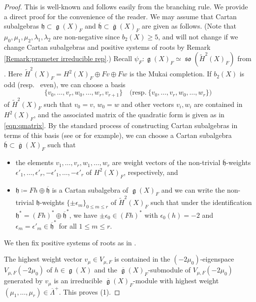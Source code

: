 \documentclass[12pt,reqno]{amsart}
\theoremstyle{definition}
\renewcommand\ge{\mathop{\mathfrak{g}}\nolimits}
\newcommand\so{\mathop{\mathfrak{so}}\nolimits}
\newcommand{\frh}{\mathfrak{h}}
\numberwithin{equation}{section}
\begin{document}
\begin{proof}
    This is well-known and follows easily from the branching rule.
    We provide a direct proof for the convenience of the reader.
    We may assume that Cartan subalgebras $\frh \subset \ge(X)_F$ and $\overline{\frh} \subset \overline{\ge}(X)_F$ are given as follows.
    (Note that  $\mu_0, \mu_1, \mu_2, \lambda_1, \lambda_2$ are non-negative since $b_2(X) \geq 5$, and will not change if we change Cartan subalgebras and positive systems of roots by Remark \ref{Remark:prameter irreducible rep}.)
    Recall
    $
    \psi_F \colon \ge(X)_F \simeq \so (\widetilde{H}^2 (X)_F)
    $
    from .
    Here $\widetilde{H}^2 (X)_F = H^2(X)_F \oplus Fv \oplus Fw$ is the Mukai completion.
    If $b_2(X)$ is odd (resp.~ even), we can choose a basis 
\[
\{v_0, \ldots, v_r, w_0, \ldots, w_r, v_{r+1}\}
\quad \mathrm{(resp.~ } \{
v_0, \ldots, v_r, w_0, \ldots, w_r
\})
\]
of $\widetilde{H}^2 (X)_F$
such that $v_0=v$, $w_0=w$ and other vectors $v_i, w_i$ are contained in $H^2(X)_F$,
and the associated matrix of the quadratic form is given as in \eqref{eqn:qmatrix}.
By the standard process of constructing Cartan subalgebras in terms of this basis (see \cite[Lecture 18]{FultonHarris} or \cite[Section 21 (j)]{Milne17} for example), 
we can choose a Cartan subalgebra $\overline{\frh} \subset \overline{\ge}(X)_F$ such that
\begin{itemize}
    \item the elements
$v_1, \ldots, v_r, w_1, \ldots, w_r$ are weight vectors of the non-trivial $\overline{\frh}$-weights
$\epsilon'_1, \ldots, \epsilon'_r, -\epsilon'_1, \ldots, -\epsilon'_r$ of $H^2(X)_F$, respectively, and
    \item $\frh\coloneqq Fh \oplus \overline{\frh}$ is a Cartan subalgebra of $\ge(X)_F$ and we can write the non-trivial $\frh$-weights
$\{\pm \epsilon_m\}_{0 \leq m \leq r}$
of $\widetilde{H}^2(X)_F$ such that under the identification $\frh^*=(Fh)^* \oplus \overline{\frh}^*$, we have $\pm \epsilon_0 \in (Fh)^*$ with $\epsilon_0(h)=-2$ and $\epsilon_m = \epsilon'_m \in \overline{\frh}^*$ for all $1 \leq m \leq r$.
\end{itemize}
We then fix positive systems of roots as in .

The highest weight vector $v_\mu \in V_{\mu, F}$ is contained in the $(-2\mu_0)$-eigenspace $V_{\mu, F}(-2\mu_0)$ of $h \in \ge(X)$ and
the $\overline{\ge}(X)_F$-submodule of $V_{\mu, F}(-2\mu_0)$ generated by $v_\mu$ is an irreducible $\overline{\ge}(X)_F$-module with highest weight $(\mu_1, \dotsc, \mu_r) \in \overline{\Lambda}^+$.
This proves (1).


\end{proof}
\end{document}
